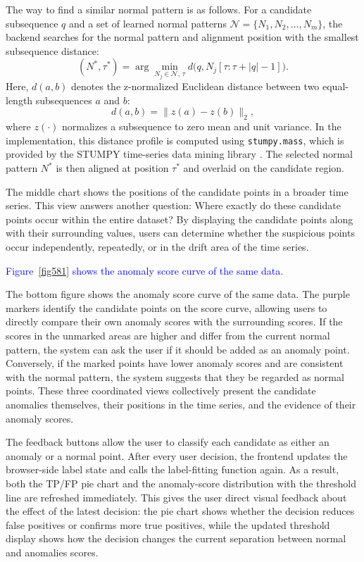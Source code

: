 The way to find a similar normal pattern is as follows. For a candidate subsequence $q$ and a set of learned normal patterns $\mathcal{N}=\{N_1,N_2,\ldots,N_m\}$, the backend searches for the normal pattern and alignment position with the smallest subsequence distance:
\[
(N^{*}, \tau^{*}) =
\arg\min_{N_j \in \mathcal{N},\, \tau}
d\bigl(q, N_j[\tau:\tau+|q|-1]\bigr).
\]
Here, $d(a,b)$ denotes the z-normalized Euclidean distance between two equal-length subsequences $a$ and $b$:
\[d(a,b)=\|z(a)-z(b)\|_2,\]
where $z(\cdot)$ normalizes a subsequence to zero mean and unit variance. In the implementation, this distance profile is computed using \texttt{stumpy.mass}, which is provided by the STUMPY time-series data mining library \citep{law2019stumpy}. The selected normal pattern $N^{*}$ is then aligned at position $\tau^{*}$ and overlaid on the candidate region.




The middle chart shows the positions of the candidate points in a broader time series. This view answers another question: Where exactly do these candidate points occur within the entire dataset? By displaying the candidate points along with their surrounding values, users can determine whether the suspicious points occur independently, repeatedly, or in the drift area of the time series. 

\textcolor{blue}{Figure~\ref{fig581} shows the anomaly score curve of the same data.}

The bottom figure  shows the anomaly score curve of the same data. The purple markers identify the candidate points on the score curve, allowing users to directly compare their own anomaly scores with the surrounding scores. If the scores in the unmarked areas are higher and differ from the current normal pattern, the system can ask the user if it should be added as an anomaly point. Conversely, if the marked points have lower anomaly scores and are consistent with the normal pattern, the system suggests that they be regarded as normal points. These three coordinated views collectively present the candidate anomalies themselves, their positions in the time series, and the evidence of their anomaly scores.

The feedback buttons allow the user to classify each candidate as either an anomaly or a normal point. After every user decision, the frontend updates the browser-side label state and calls the label-fitting function again. As a result, both the TP/FP pie chart and the anomaly-score distribution with the threshold line are refreshed immediately. This gives the user direct visual feedback about the effect of the latest decision: the pie chart shows whether the decision reduces false positives or confirms more true positives, while the updated threshold display shows how the decision changes the current separation between normal and anomalies scores.

